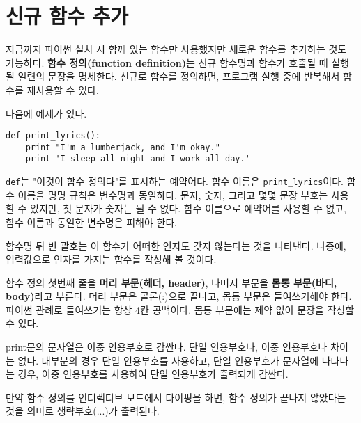 \section{신규 함수 추가}

지금까지 파이썬 설치 시 함께 있는 함수만 사용했지만 새로운 함수를 추가하는 것도 가능하다.
{\bf 함수 정의(function definition)}는 신규 함수명과 함수가 호출될 때 실행될 일련의 문장을 명세한다.
신규로 함수를 정의하면, 프로그램 실행 중에 반복해서 함수를 재사용할 수 있다. 


다음에 예제가 있다.

\beforeverb
\begin{verbatim}
def print_lyrics():
    print "I'm a lumberjack, and I'm okay."
    print 'I sleep all night and I work all day.'
\end{verbatim}
\afterverb
%

{\tt def}는 "이것이 함수 정의다"를 표시하는 예약어다. 
함수 이름은 \verb"print_lyrics"이다.
함수 이름을 명명 규칙은 변수명과 동일하다. 
문자, 숫자, 그리고 몇몇 문장 부호는 사용할 수 있지만, 첫 문자가 숫자는 될 수 없다. 
함수 이름으로 예약어를 사용할 수 없고, 함수 이름과 동일한 변수명은 피해야 한다.


함수명 뒤 빈 괄호는 이 함수가 어떠한 인자도 갖지 않는다는 것을 나타낸다.
나중에, 입력값으로 인자를 가지는 함수를 작성해 볼 것이다.


함수 정의 첫번째 줄을 {\bf 머리 부문(헤더, header)}, 나머지 부문을 {\bf 몸통 부문(바디, body)}라고 부른다.
머리 부문은 콜론(:)으로 끝나고, 몸통 부문은 들여쓰기해야 한다.
파이썬 관례로 들여쓰기는 항상 4칸 공백이다. 
몸통 부문에는 제약 없이 문장을 작성할 수 있다.

print문의 문자열은 이중 인용부호로 감싼다. 
단일 인용부호나, 이중 인용부호나 차이는 없다.
대부분의 경우 단일 인용부호를 사용하고, 단일 인용부호가 문자열에 나타나는 경우, 이중 인용부호를 사용하여 단일 인용부호가 출력되게 감싼다.


만약 함수 정의를 인터렉티브 모드에서 타이핑을 하면, 
함수 정의가 끝나지 않았다는 것을 의미로 생략부호(...)가 출력된다.

